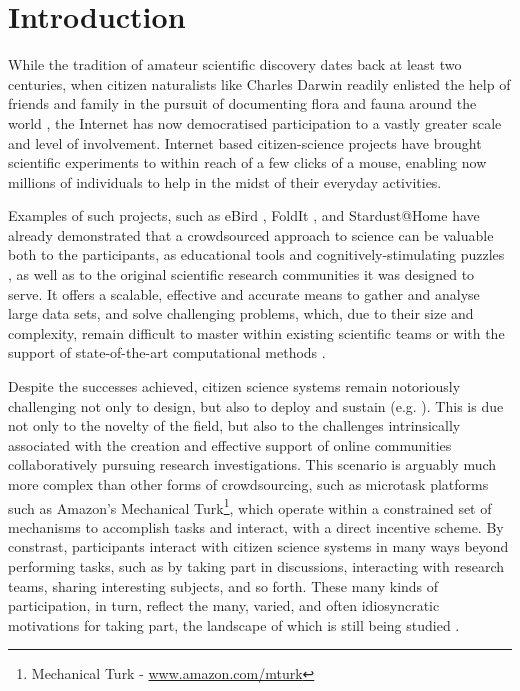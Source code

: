 \documentclass{sigchi}
\begin{document}

\section{Introduction}


While the tradition of amateur scientific discovery dates back at least two centuries, when citizen naturalists like Charles Darwin readily enlisted the help of friends and family in the pursuit of documenting flora and fauna around the world \cite{silvertown2009new}, the Internet has now democratised participation to a vastly greater scale and level of involvement.  Internet based citizen-science projects have brought scientific experiments to within reach of a few clicks of a mouse, enabling now millions of individuals to help in the midst of their everyday activities.

Examples of such projects, such as eBird \cite{wood2011ebird}, FoldIt \cite{khatib2011algorithm}, and Stardust@Home \cite{westphal2005stardust} have already demonstrated that a crowdsourced approach to science can be valuable both to the participants, as educational tools and cognitively-stimulating puzzles \cite{gray2012lessons}, as well as to the original scientific research communities it was designed to serve. It offers a scalable, effective and accurate means to gather and analyse large data sets, and solve challenging problems, which, due to their size and complexity, remain difficult to master within existing scientific teams or with the support of state-of-the-art computational methods \cite{fortson2011galaxy,lintott2008galaxy,simpson2013dynamic}. %


Despite the successes achieved, citizen science systems remain notoriously challenging not only to design, but also to deploy and sustain (e.g. \cite{ebird, ubiome, druschke2012failures}). This is due not only to the novelty of the field, but also to the challenges intrinsically associated with the creation and effective support of online communities collaboratively pursuing research investigations. This scenario is arguably much more complex than other forms of crowdsourcing, such as microtask platforms such as Amazon's Mechanical Turk\footnote{Mechanical Turk - \url{www.amazon.com/mturk}}, which operate within a constrained set of mechanisms to accomplish tasks and interact, with a direct incentive scheme. By constrast, participants  interact with citizen science systems in many ways beyond performing tasks, such as by taking part in discussions, interacting with research teams, sharing interesting subjects, and so forth.  These many kinds of participation, in turn, reflect the many, varied, and often idiosyncratic motivations for taking part, the landscape of which is still being studied \cite{raddick2010galaxy}.
\end{document}
